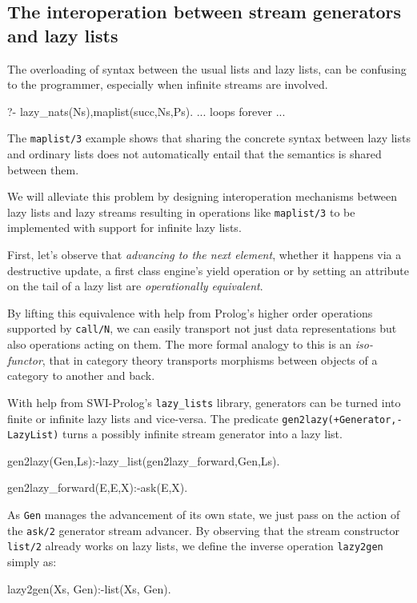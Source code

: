 \documentclass{new_tlp}
\begin{document}
\subsection{The interoperation between stream generators and lazy lists}

The overloading of syntax between the usual lists and lazy lists, 
can be confusing to the
programmer, especially when infinite streams are involved.

\BX
\begin{codex}
?- lazy_nats(Ns),maplist(succ,Ns,Ps).
... loops forever ...
\end{codex}
\EX
The {\tt maplist/3} example
 shows that sharing the concrete syntax between lazy lists and  ordinary lists
does not automatically entail that the semantics is shared between them.

We will alleviate this problem by designing interoperation mechanisms between lazy lists and lazy streams resulting in operations like {\tt maplist/3} to be implemented with support for infinite lazy lists.

First, let's observe that  {\em advancing to the next element}, 
whether it happens via a destructive update,
a first class engine's yield operation or by setting an attribute on the tail of
a lazy list are {\em operationally equivalent}.

By lifting this equivalence with help from Prolog's higher order operations
supported by {\tt call/N}, we can easily transport not just  data representations 
but also   operations acting on them.
The more formal analogy to this is an {\em iso-functor}, that in category theory
transports morphisms between objects of a category to another and back. 

With help from SWI-Prolog's {\tt lazy\_lists} library, 
generators can be turned into finite or infinite lazy lists and vice-versa.
The predicate {\tt gen2lazy(+Generator,-LazyList)} turns a possibly infinite
stream generator into a lazy list.
\begin{code} 
gen2lazy(Gen,Ls):-lazy_list(gen2lazy_forward,Gen,Ls).

gen2lazy_forward(E,E,X):-ask(E,X).
\end{code}
As {\tt Gen}  manages the advancement of its own state, 
we just pass on the action of the {\tt ask/2}
generator stream advancer.
By observing that the stream constructor {\tt list/2} already works
on lazy lists, we define the inverse operation {\tt lazy2gen} simply as:
\begin{code}
lazy2gen(Xs, Gen):-list(Xs, Gen).
\end{code}
\end{document}
